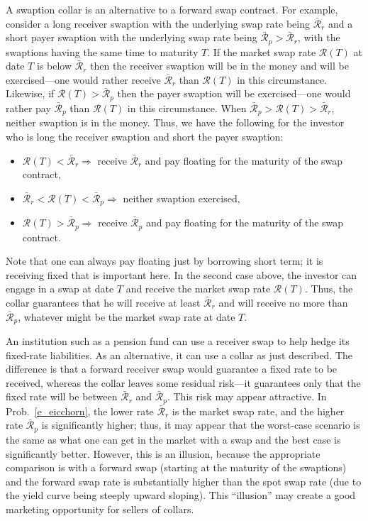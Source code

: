 \begin{prob}
A swaption collar  is an alternative to a forward swap contract.   For example, consider a long receiver swaption with the underlying swap rate being $\bar{\mathcal{R}}_r$ and a short payer swaption with the underlying swap rate being $\bar{\mathcal{R}}_p > \bar{\mathcal{R}}_r$, with the swaptions having the same time to maturity $T$.  If the market swap rate $\mathcal{R}(T)$ at date $T$ is  below $\bar{\mathcal{R}}_r$ then the receiver swaption will be in the money and will be exercised---one would rather receive  $\bar{\mathcal{R}}_r$ than $\mathcal{R}(T)$ in this circumstance.  Likewise, if $\mathcal{R}(T) > \bar{\mathcal{R}}_p$ then the payer swaption will be exercised---one would rather pay $\bar{\mathcal{R}}_p$ than $\mathcal{R}(T)$ in this circumstance.  When $\bar{\mathcal{R}}_p >\mathcal{R}(T)> \bar{\mathcal{R}}_r$, neither swaption is in the money.  Thus, we have the following for the investor who is long the receiver swaption and short the payer swaption:
\begin{itemize}
\item $\mathcal{R}(T)< \bar{\mathcal{R}}_r \Longrightarrow$ receive $\bar{\mathcal{R}}_r$ and pay floating for the maturity of the swap contract,
\item $\bar{\mathcal{R}}_r< \mathcal{R}(T)< \bar{\mathcal{R}}_p \Longrightarrow$ neither swaption exercised,
\item $\mathcal{R}(T) > \bar{\mathcal{R}}_p \Longrightarrow$ receive $\bar{\mathcal{R}}_p$ and pay floating for the maturity of the swap contract.
\end{itemize}
Note that one can always pay floating just by borrowing short term; it is receiving fixed that is important here.  In the second case above, the investor can engage in a swap at date $T$  and receive the market swap rate $\mathcal{R}(T)$.  Thus, the collar guarantees that he will receive at least $\bar{\mathcal{R}}_r$ and will receive no more than $\bar{\mathcal{R}}_p$, whatever might be the market swap rate at date $T$.

An institution such as a pension fund can use a receiver swap to help hedge its fixed-rate liabilities.  As an alternative, it can use a collar as just described.  The difference is that a forward receiver swap would guarantee a fixed rate to be received, whereas the collar leaves some residual risk---it guarantees only that the fixed rate will be between $\bar{\mathcal{R}}_r$ and $\bar{\mathcal{R}}_p$.
This risk may appear attractive.  In Prob.~\ref{e_eicchorn}, the lower rate $\bar{\mathcal{R}}_r$ is the market swap rate, and the higher rate $\bar{\mathcal{R}}_p$ is significantly higher; thus, it may appear that the worst-case scenario is the same as what one can get in the market with a swap and the best case is significantly better.  However, this is an illusion, because the appropriate comparison is with a forward swap (starting at the maturity of the swaptions) and the forward swap rate is substantially higher than the spot swap rate (due to the yield curve being steeply upward sloping).  This ``illusion'' may create a good marketing opportunity for sellers of collars.  
\end{prob}